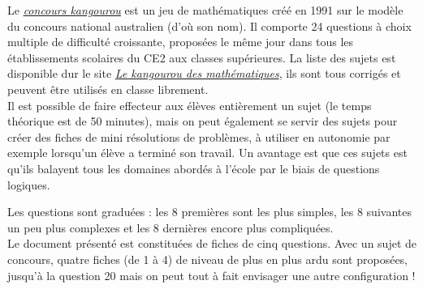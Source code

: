 \begin{exercice*} %
   Le \href{http://www.mathkang.org/concours/}{\it\blue concours kangourou} est un jeu de mathématiques créé en 1991 sur le modèle du concours national australien (d'où son nom). Il comporte 24 questions à choix multiple de difficulté croissante, proposées le même jour dans tous les établissements scolaires du CE2 aux classes supérieures. La liste des sujets est disponible dur le site \href{http://www.mathkang.org/concours/}{\it\blue Le kangourou des mathématiques}, ils sont tous corrigés et peuvent être utilisés en classe librement. \\
   Il est possible de faire effecteur aux élèves entièrement un sujet (le temps théorique est de 50 minutes), mais on peut également se servir des sujets pour créer des fiches de mini résolutions de problèmes, à utiliser en autonomie par exemple lorsqu'un élève a terminé son travail. Un avantage est que ces sujets est qu'ils balayent tous les domaines abordés à l'école par le biais de questions logiques.
    \begin{center}
   \end{center}
   Les questions sont graduées : les 8 premières sont les plus simples, les 8 suivantes un peu plus complexes et les 8 dernières encore plus compliquées. \\
   Le document présenté est constituées de fiches de cinq questions. Avec un sujet de concours, quatre fiches (de 1 à 4) de niveau de plus en plus ardu sont proposées, jusqu'à la question 20 mais on peut tout à fait envisager une autre configuration !
\end{exercice*}


